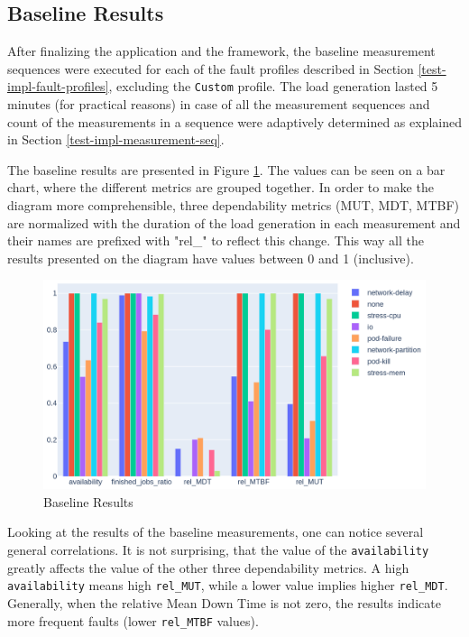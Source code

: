 \subsection{Baseline Results} \label{baseline-results}

After finalizing the application and the framework, the baseline measurement sequences were executed for each of the fault profiles described in Section \ref{test-impl-fault-profiles}, excluding the \texttt{Custom} profile. The load generation lasted 5 minutes (for practical reasons) in case of all the measurement sequences and count of the measurements in a sequence were adaptively determined as explained in Section \ref{test-impl-measurement-seq}. 

The baseline results are presented in Figure \ref{fig:baseline_results}. The values can be seen on a bar chart, where the different metrics are grouped together. In order to make the diagram more comprehensible, three dependability metrics (MUT, MDT, MTBF) are normalized with the duration of the load generation in each measurement and their names are prefixed with "rel\_" to reflect this change. This way all the results presented on the diagram have values between 0 and 1 (inclusive).

\begin{figure}[h]
	\centering
	\includegraphics[width=140mm, keepaspectratio]{figures/baseline_grouped_barchart.png}
	\caption{Baseline Results}
	\label{fig:baseline_results}
\end{figure}

Looking at the results of the baseline measurements, one can notice several general correlations. It is not surprising, that the value of the \texttt{availability} greatly affects the value of the other three dependability metrics. A high \texttt{availability} means high \texttt{rel\_MUT}, while a lower value implies higher \texttt{rel\_MDT}. Generally, when the relative Mean Down Time is not zero, the results indicate more frequent faults (lower \texttt{rel\_MTBF} values).

